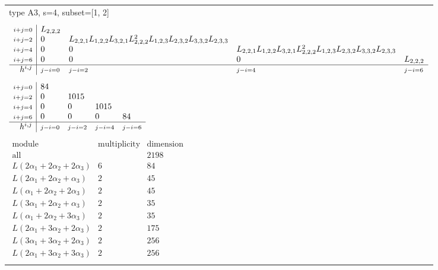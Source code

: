 \documentclass[crop,border=2mm]{standalone}
\begin{document}
\begin{tabular}{l}
{\huge type A3, s=4, subset=[1, 2]}\\ \\


$\displaystyle
\begin{array}{r|l l l l}
	{\scriptstyle i+j=0}&L_{2,2,2}&&&\\
	{\scriptstyle i+j=2}&0&L_{2,2,1}L_{1,2,2}L_{3,2,1}L_{2,2,2}^{2}L_{1,2,3}L_{2,3,2}L_{3,3,2}L_{2,3,3}&&\\
	{\scriptstyle i+j=4}&0&0&L_{2,2,1}L_{1,2,2}L_{3,2,1}L_{2,2,2}^{2}L_{1,2,3}L_{2,3,2}L_{3,3,2}L_{2,3,3}&\\
	{\scriptstyle i+j=6}&0&0&0&L_{2,2,2}\\
	\hline h^{i,j}&{\scriptstyle j-i=0}&{\scriptstyle j-i=2}&{\scriptstyle j-i=4}&{\scriptstyle j-i=6}
\end{array}
$ \\ \\


$\displaystyle
\begin{array}{r|l l l l}
	{\scriptstyle i+j=0}&84&&&\\
	{\scriptstyle i+j=2}&0&1015&&\\
	{\scriptstyle i+j=4}&0&0&1015&\\
	{\scriptstyle i+j=6}&0&0&0&84\\
	\hline h^{i,j}&{\scriptstyle j-i=0}&{\scriptstyle j-i=2}&{\scriptstyle j-i=4}&{\scriptstyle j-i=6}
\end{array}
$ \\ \\


$\displaystyle
\begin{array}{rll}
	\text{module}&\text{multiplicity}&\text{dimension} \\ \hline \text{all}&&2198 \\
	L\left( 2\alpha_{1}+ 2\alpha_{2}+ 2\alpha_{3}\right)&6&84\\
	L\left( 2\alpha_{1}+ 2\alpha_{2}+\alpha_{3}\right)&2&45\\
	L\left(\alpha_{1}+ 2\alpha_{2}+ 2\alpha_{3}\right)&2&45\\
	L\left( 3\alpha_{1}+ 2\alpha_{2}+\alpha_{3}\right)&2&35\\
	L\left(\alpha_{1}+ 2\alpha_{2}+ 3\alpha_{3}\right)&2&35\\
	L\left( 2\alpha_{1}+ 3\alpha_{2}+ 2\alpha_{3}\right)&2&175\\
	L\left( 3\alpha_{1}+ 3\alpha_{2}+ 2\alpha_{3}\right)&2&256\\
	L\left( 2\alpha_{1}+ 3\alpha_{2}+ 3\alpha_{3}\right)&2&256
\end{array}
$ \\ \\

\end{tabular}
\end{document}
